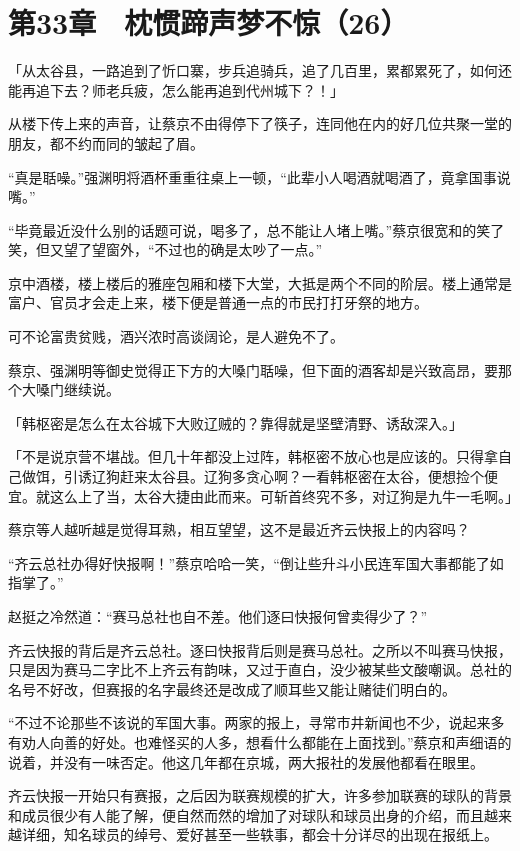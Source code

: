 \section{第33章　枕惯蹄声梦不惊（26）}

「从太谷县，一路追到了忻口寨，步兵追骑兵，追了几百里，累都累死了，如何还能再追下去？师老兵疲，怎么能再追到代州城下？！」

从楼下传上来的声音，让蔡京不由得停下了筷子，连同他在内的好几位共聚一堂的朋友，都不约而同的皱起了眉。

“真是聒噪。”强渊明将酒杯重重往桌上一顿，“此辈小人喝酒就喝酒了，竟拿国事说嘴。”

“毕竟最近没什么别的话题可说，喝多了，总不能让人堵上嘴。”蔡京很宽和的笑了笑，但又望了望窗外，“不过也的确是太吵了一点。”

京中酒楼，楼上楼后的雅座包厢和楼下大堂，大抵是两个不同的阶层。楼上通常是富户、官员才会走上来，楼下便是普通一点的市民打打牙祭的地方。

可不论富贵贫贱，酒兴浓时高谈阔论，是人避免不了。

蔡京、强渊明等御史觉得正下方的大嗓门聒噪，但下面的酒客却是兴致高昂，要那个大嗓门继续说。

「韩枢密是怎么在太谷城下大败辽贼的？靠得就是坚壁清野、诱敌深入。」

「不是说京营不堪战。但几十年都没上过阵，韩枢密不放心也是应该的。只得拿自己做饵，引诱辽狗赶来太谷县。辽狗多贪心啊？一看韩枢密在太谷，便想捡个便宜。就这么上了当，太谷大捷由此而来。可斩首终究不多，对辽狗是九牛一毛啊。」

蔡京等人越听越是觉得耳熟，相互望望，这不是最近齐云快报上的内容吗？

“齐云总社办得好快报啊！”蔡京哈哈一笑，“倒让些升斗小民连军国大事都能了如指掌了。”

赵挺之冷然道：“赛马总社也自不差。他们逐曰快报何曾卖得少了？”

齐云快报的背后是齐云总社。逐曰快报背后则是赛马总社。之所以不叫赛马快报，只是因为赛马二字比不上齐云有韵味，又过于直白，没少被某些文酸嘲讽。总社的名号不好改，但赛报的名字最终还是改成了顺耳些又能让赌徒们明白的。

“不过不论那些不该说的军国大事。两家的报上，寻常市井新闻也不少，说起来多有劝人向善的好处。也难怪买的人多，想看什么都能在上面找到。”蔡京和声细语的说着，并没有一味否定。他这几年都在京城，两大报社的发展他都看在眼里。

齐云快报一开始只有赛报，之后因为联赛规模的扩大，许多参加联赛的球队的背景和成员很少有人能了解，便自然而然的增加了对球队和球员出身的介绍，而且越来越详细，知名球员的绰号、爱好甚至一些轶事，都会十分详尽的出现在报纸上。

